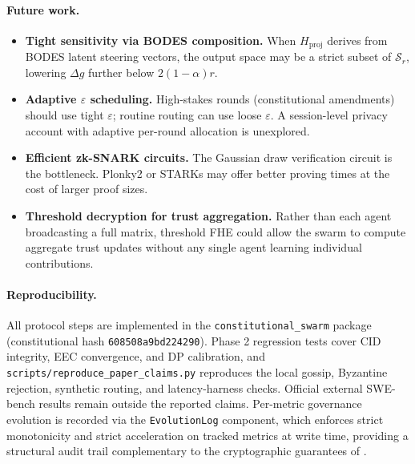 \paragraph{Future work.}
\begin{itemize}
  \item \textbf{Tight sensitivity via BODES composition.}  When $H_{\mathrm{proj}}$
    derives from BODES latent steering vectors, the output space may be a strict subset
    of $\mathcal{S}_r$, lowering $\Delta g$ further below $2(1-\alpha)r$.

  \item \textbf{Adaptive $\varepsilon$ scheduling.}  High-stakes rounds (constitutional
    amendments) should use tight $\varepsilon$; routine routing can use loose $\varepsilon$.
    A session-level privacy account with adaptive per-round allocation is unexplored.

  \item \textbf{Efficient zk-SNARK circuits.}  The Gaussian draw verification circuit
    is the bottleneck.  Plonky2 or STARKs may offer better proving times at the cost
    of larger proof sizes.

  \item \textbf{Threshold decryption for trust aggregation.}  Rather than each agent
    broadcasting a full matrix, threshold FHE could allow the swarm to compute aggregate
    trust updates without any single agent learning individual contributions.
\end{itemize}

\paragraph{Reproducibility.}
All protocol steps are implemented in the \texttt{constitutional\_swarm} package
(constitutional hash \texttt{608508a9bd224290}).  Phase 2 regression tests cover CID
integrity, EEC convergence, and DP calibration, and
\texttt{scripts/reproduce\_paper\_claims.py} reproduces the local gossip, Byzantine
rejection, synthetic routing, and latency-harness checks.  Official external SWE-bench
results remain outside the reported claims.  Per-metric governance evolution is recorded
via the
\texttt{EvolutionLog} component, which enforces strict monotonicity and strict
acceleration on tracked metrics at write time, providing a structural audit trail
complementary to the cryptographic guarantees of \fedsink{}.

